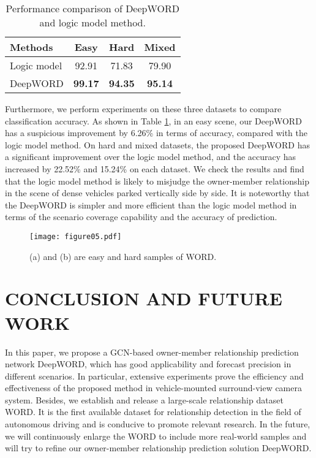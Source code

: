\documentclass{article}
\begin{document}
\begin{table}[!b]
\setlength{\tabcolsep}{15pt}
\centering
\small
\caption{Performance comparison of DeepWORD and logic model method.}
\label{table03}

\begin{tabular}{@{}lccc@{}}
\toprule
Methods             & Easy  & Hard  & Mixed \\ \midrule
Logic model & 92.91 & 71.83 & 79.90 \\
DeepWORD           &  \textbf{99.17} &  \textbf{94.35} &  \textbf{95.14} \\ \bottomrule
\end{tabular}
\end{table}

Furthermore, we perform experiments on these three datasets to compare classification accuracy. As shown in Table \ref{table03}, in an easy scene, our DeepWORD has a suspicious improvement by 6.26\% in terms of accuracy, compared with the logic model method. On hard and mixed datasets, the proposed DeepWORD has a significant improvement over the logic model method, and the accuracy has increased by 22.52\% and 15.24\% on each dataset. We check the results and find that the logic model method is likely to misjudge the owner-member relationship in the scene of dense vehicles parked vertically side by side. It is noteworthy that the DeepWORD is simpler and more efficient than the logic model method in terms of the scenario coverage capability and the accuracy of prediction.
% 
\begin{figure}[!h]
    \centering
    \texttt{[image: figure05.pdf]}
    \caption{(a) and (b) are easy and hard samples of WORD.}
    \label{fig:Figure05}
\end{figure}

\section{CONCLUSION AND FUTURE WORK}

In this paper, we propose a GCN-based owner-member relationship prediction network DeepWORD, which has good applicability and forecast precision in different scenarios. In particular, extensive experiments prove the efficiency and effectiveness of the proposed method in vehicle-mounted surround-view camera system. Besides, we establish and release a large-scale relationship dataset WORD. It is the first available dataset for relationship detection in the field of autonomous driving and is conducive to promote relevant research. In the future, we will continuously enlarge the WORD to include more real-world samples and will try to refine our owner-member relationship prediction solution DeepWORD.
\end{document}
